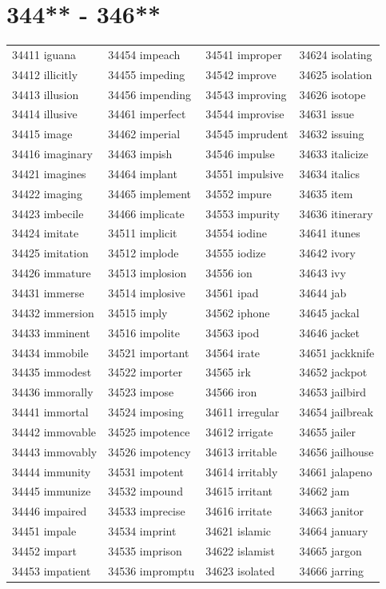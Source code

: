 \documentclass[10pt, oneside]{book}
\begin{document}
\begin{table}
	\centering
	\section*{344** - 346**}
	\begin{tabular}{l l l l}
34411 iguana &34454 impeach &34541 improper &34624 isolating\\
34412 illicitly &34455 impeding &34542 improve &34625 isolation\\
34413 illusion &34456 impending &34543 improving &34626 isotope\\
34414 illusive &34461 imperfect &34544 improvise &34631 issue\\
34415 image &34462 imperial &34545 imprudent &34632 issuing\\
34416 imaginary &34463 impish &34546 impulse &34633 italicize\\
34421 imagines &34464 implant &34551 impulsive &34634 italics\\
34422 imaging &34465 implement &34552 impure &34635 item\\
34423 imbecile &34466 implicate &34553 impurity &34636 itinerary\\
34424 imitate &34511 implicit &34554 iodine &34641 itunes\\
34425 imitation &34512 implode &34555 iodize &34642 ivory\\
34426 immature &34513 implosion &34556 ion &34643 ivy\\
34431 immerse &34514 implosive &34561 ipad &34644 jab\\
34432 immersion &34515 imply &34562 iphone &34645 jackal\\
34433 imminent &34516 impolite &34563 ipod &34646 jacket\\
34434 immobile &34521 important &34564 irate &34651 jackknife\\
34435 immodest &34522 importer &34565 irk &34652 jackpot\\
34436 immorally &34523 impose &34566 iron &34653 jailbird\\
34441 immortal &34524 imposing &34611 irregular &34654 jailbreak\\
34442 immovable &34525 impotence &34612 irrigate &34655 jailer\\
34443 immovably &34526 impotency &34613 irritable &34656 jailhouse\\
34444 immunity &34531 impotent &34614 irritably &34661 jalapeno\\
34445 immunize &34532 impound &34615 irritant &34662 jam\\
34446 impaired &34533 imprecise &34616 irritate &34663 janitor\\
34451 impale &34534 imprint &34621 islamic &34664 january\\
34452 impart &34535 imprison &34622 islamist &34665 jargon\\
34453 impatient &34536 impromptu &34623 isolated &34666 jarring\\
	\end{tabular}
 \end{table}
\clearpage
\end{document}
